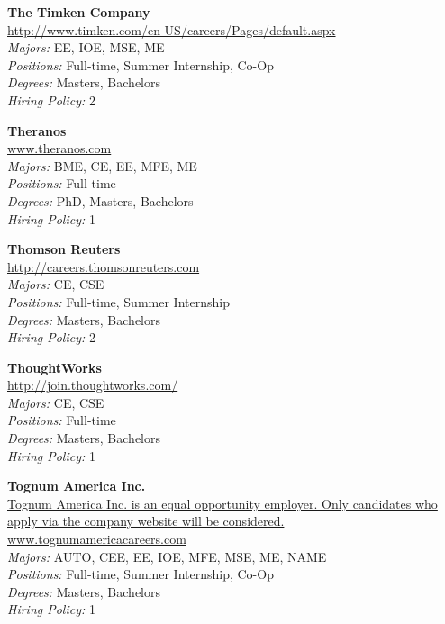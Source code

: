 \documentclass{article}
\begin{document}
\begin{center}
\begin{multicols}{3}
\begin{minipage}{.9\columnwidth}{\Large\bf The Timken Company }\\
	\url{http://www.timken.com/en-US/careers/Pages/default.aspx}\\
	\emph{Majors:} EE, IOE, MSE, ME\\
	\emph{Positions:} Full-time, Summer Internship, Co-Op\\
	\emph{Degrees:} Masters, Bachelors\\
	\emph{Hiring Policy:} 2\\
\end{minipage}
 
\begin{minipage}{.9\columnwidth}{\Large\bf Theranos }\\
	\url{www.theranos.com}\\
	\emph{Majors:} BME, CE, EE, MFE, ME\\
	\emph{Positions:} Full-time\\
	\emph{Degrees:} PhD, Masters, Bachelors\\
	\emph{Hiring Policy:} 1\\
\end{minipage}
 
\begin{minipage}{.9\columnwidth}{\Large\bf Thomson Reuters }\\
	\url{http://careers.thomsonreuters.com}\\
	\emph{Majors:} CE, CSE\\
	\emph{Positions:} Full-time, Summer Internship\\
	\emph{Degrees:} Masters, Bachelors\\
	\emph{Hiring Policy:} 2\\
\end{minipage}
 
\begin{minipage}{.9\columnwidth}{\Large\bf ThoughtWorks }\\
	\url{http://join.thoughtworks.com/}\\
	\emph{Majors:} CE, CSE\\
	\emph{Positions:} Full-time\\
	\emph{Degrees:} Masters, Bachelors\\
	\emph{Hiring Policy:} 1\\
\end{minipage}
 
\begin{minipage}{.9\columnwidth}{\Large\bf Tognum America Inc. }\\
	\url{Tognum America Inc. is an equal opportunity employer. Only candidates who apply via the company website will be considered. www.tognumamericacareers.com}\\
	\emph{Majors:} AUTO, CEE, EE, IOE, MFE, MSE, ME, NAME\\
	\emph{Positions:} Full-time, Summer Internship, Co-Op\\
	\emph{Degrees:} Masters, Bachelors\\
	\emph{Hiring Policy:} 1\\
\end{minipage}
 

\end{multicols}
\end{center}
\end{document}
